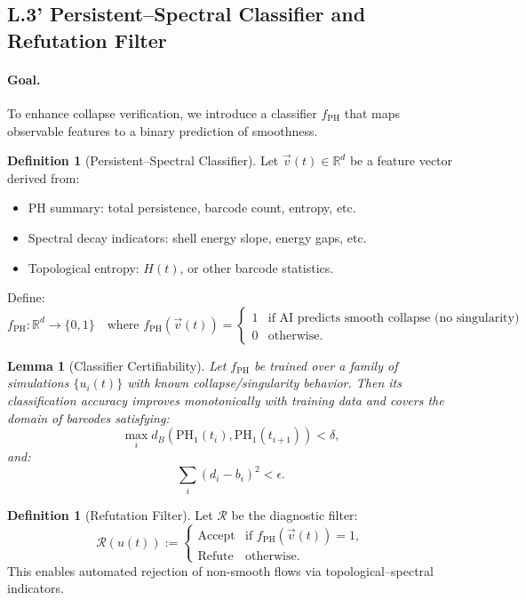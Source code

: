 \documentclass[11pt]{article}
\newtheorem{lemma}[theorem]{Lemma}
\theoremstyle{definition}
\newtheorem{definition}[theorem]{Definition}
\begin{document}
\subsection*{L.3' Persistent–Spectral Classifier and Refutation Filter}

\paragraph{Goal.}
To enhance collapse verification, we introduce a classifier $f_{\mathrm{PH}}$ that maps observable features to a binary prediction of smoothness.

\begin{definition}[Persistent–Spectral Classifier]
Let $\vec{v}(t) \in \mathbb{R}^d$ be a feature vector derived from:
\begin{itemize}
  \item PH summary: total persistence, barcode count, entropy, etc.
  \item Spectral decay indicators: shell energy slope, energy gaps, etc.
  \item Topological entropy: $H(t)$, or other barcode statistics.
\end{itemize}
Define:
\[
f_{\mathrm{PH}} : \mathbb{R}^d \to \{0,1\}
\quad \text{where } f_{\mathrm{PH}}(\vec{v}(t)) = 
\begin{cases}
1 & \text{if AI predicts smooth collapse (no singularity)} \\
0 & \text{otherwise}.
\end{cases}
\]
\end{definition}

\begin{lemma}[Classifier Certifiability]
Let $f_{\mathrm{PH}}$ be trained over a family of simulations $\{ u_i(t) \}$ with known collapse/singularity behavior.  
Then its classification accuracy improves monotonically with training data and covers the domain of barcodes satisfying:
\[
\max_i d_B(\mathrm{PH}_1(t_i), \mathrm{PH}_1(t_{i+1})) < \delta,
\]
and:
\[
\sum_i (d_i - b_i)^2 < \epsilon.
\]
\end{lemma}

\begin{definition}[Refutation Filter]
Let $\mathcal{R}$ be the diagnostic filter:
\[
\mathcal{R}(u(t)) := 
\begin{cases}
\text{Accept} & \text{if } f_{\mathrm{PH}}(\vec{v}(t)) = 1, \\
\text{Refute} & \text{otherwise}.
\end{cases}
\]
This enables automated rejection of non-smooth flows via topological–spectral indicators.
\end{definition}
\end{document}
